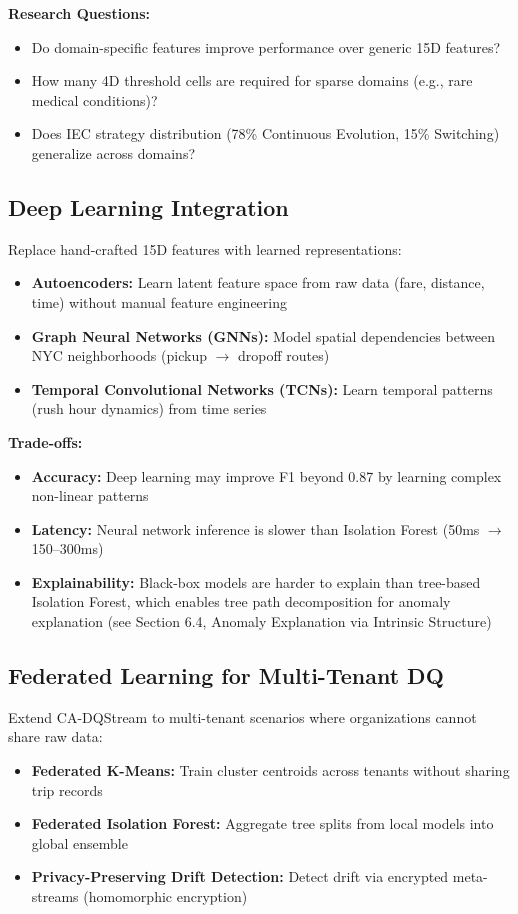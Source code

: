 \textbf{Research Questions:}
\begin{itemize}
    \item Do domain-specific features improve performance over generic 15D features?
    \item How many 4D threshold cells are required for sparse domains (e.g., rare medical conditions)?
    \item Does IEC strategy distribution (78\% Continuous Evolution, 15\% Switching) generalize across domains?
\end{itemize}

\subsection{Deep Learning Integration}

Replace hand-crafted 15D features with learned representations:
\begin{itemize}
    \item \textbf{Autoencoders:} Learn latent feature space from raw data (fare, distance, time) without manual feature engineering
    \item \textbf{Graph Neural Networks (GNNs):} Model spatial dependencies between NYC neighborhoods (pickup $\to$ dropoff routes)
    \item \textbf{Temporal Convolutional Networks (TCNs):} Learn temporal patterns (rush hour dynamics) from time series
\end{itemize}

\textbf{Trade-offs:}
\begin{itemize}
    \item \textbf{Accuracy:} Deep learning may improve F1 beyond 0.87 by learning complex non-linear patterns
    \item \textbf{Latency:} Neural network inference is slower than Isolation Forest (50ms $\to$ 150--300ms)
    \item \textbf{Explainability:} Black-box models are harder to explain than tree-based Isolation Forest, which enables tree path decomposition for anomaly explanation (see Section 6.4, Anomaly Explanation via Intrinsic Structure)
\end{itemize}

\subsection{Federated Learning for Multi-Tenant DQ}

Extend CA-DQStream to multi-tenant scenarios where organizations cannot share raw data:
\begin{itemize}
    \item \textbf{Federated K-Means:} Train cluster centroids across tenants without sharing trip records
    \item \textbf{Federated Isolation Forest:} Aggregate tree splits from local models into global ensemble
    \item \textbf{Privacy-Preserving Drift Detection:} Detect drift via encrypted meta-streams (homomorphic encryption)
\end{itemize}

